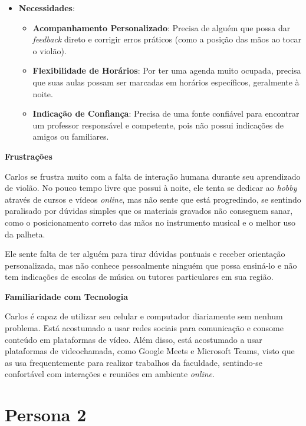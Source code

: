 \begin{apendicesenv}
\begin{itemize}
\item \textbf{Necessidades}:

\begin{itemize}

\item \textbf{Acompanhamento Personalizado}: Precisa de alguém que possa dar \textit{feedback} direto e corrigir erros práticos (como a posição das mãos ao tocar o
violão).

\item \textbf{Flexibilidade de Horários}: Por ter uma agenda muito ocupada, precisa que suas aulas possam ser marcadas em horários específicos, geralmente à noite.

\item \textbf{Indicação de Confiança}: Precisa de uma fonte confiável para encontrar um professor responsável e competente, pois não possui indicações de amigos ou familiares.

\end{itemize}

\end{itemize}

\textbf{Frustrações}

Carlos se frustra muito com a falta de interação humana durante seu aprendizado de violão. No pouco tempo livre que possui à noite, ele tenta se dedicar ao \textit{hobby} através de cursos e vídeos \textit{online}, mas não sente que está progredindo, se sentindo paralisado por dúvidas simples que os materiais gravados não conseguem sanar, como o posicionamento correto das mãos no instrumento musical e o melhor uso da palheta.

Ele sente falta de ter alguém para tirar dúvidas pontuais e receber orientação personalizada, mas não conhece pessoalmente ninguém que possa ensiná-lo e não tem indicações de escolas de música ou tutores particulares em sua região.

\textbf{Familiaridade com Tecnologia}

Carlos é capaz de utilizar seu celular e computador diariamente sem nenhum problema. Está acostumado a usar redes sociais para comunicação e consome conteúdo em plataformas de vídeo. Além disso, está acostumado a usar plataformas de videochamada, como Google Meets e Microsoft Teams, visto que as usa frequentemente para realizar trabalhos da faculdade, sentindo-se confortável com interações e reuniões em ambiente \textit{online}.

\newpage

\section{Persona 2}


\end{apendicesenv}
